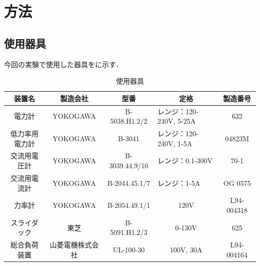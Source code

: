 \clearpage
\section{方法}
\subsection{使用器具}
今回の実験で使用した器具をに示す．
\begin{table}[h]
\centering
\caption{使用器具}
\label{tab:kigu}
\begin{tabular}{ccclc}
\hline
装置名     & 製造会社     & 型番             & \multicolumn{1}{c}{定格}        & 製造番号       \\ \hline
電力計     & YOKOGAWA & B-5038.H1.2/2  & レンジ：120-240V, 5-25A           & 632        \\
低力率用電力計 & YOKOGAWA & B-3041         & レンジ：120-240V, 1-5A            & 04823M     \\
交流用電圧計  & YOKOGAWA & B-3039.44.9/10 & レンジ：0.1-300V                  & 70-1       \\
交流用電流計  & YOKOGAWA & B-2044.45.1/7  & レンジ：1-5A                      & OG 0575    \\
力率計     & YOKOGAWA & B-2054.49.1/1  & \multicolumn{1}{c}{120V}      & L94-004318 \\
スライダック  & 東芝       & B-5091.H1.2/3  & \multicolumn{1}{c}{0-130V}    & 625        \\
総合負荷装置  & 山菱電機株式会社 & UL-100-30      & \multicolumn{1}{c}{100V, 30A} & L94-004164 \\ \hline
\end{tabular}
\end{table}

